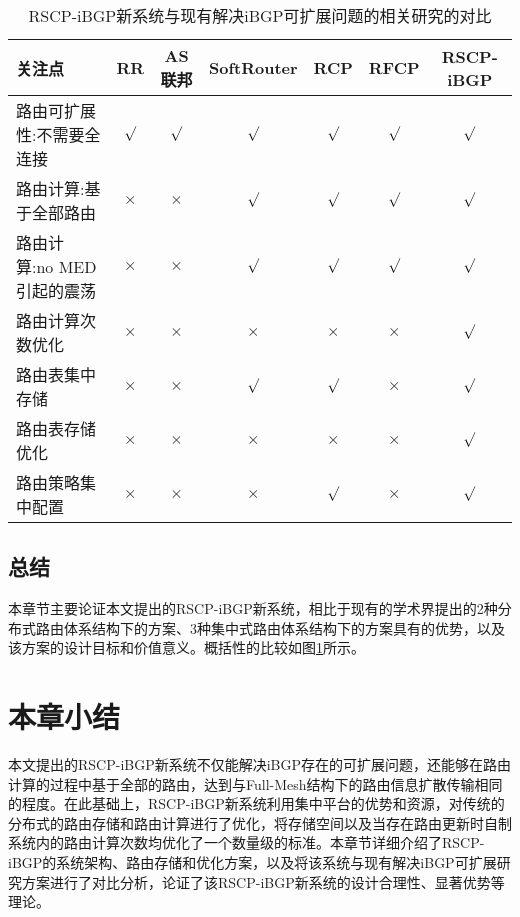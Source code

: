 \begin{table}[h]
	\centering
	\caption{RSCP-iBGP新系统与现有解决iBGP可扩展问题的相关研究的对比}
    \label{tab:compare}
	\begin{tabular}{|l|c|c|c|c|c|c|}
		\hline
		关注点 & RR & AS联邦 & SoftRouter & RCP & RFCP & RSCP-iBGP \\ \hline
		路由可扩展性:不需要全连接 &  $\surd$ &  $\surd$  & $\surd$  &$\surd$ & $\surd$  &$\surd$  \\ \hline
        路由计算:基于全部路由 & $\times$ &  $\times$  & $\surd$  &$\surd$ & $\surd$  &$\surd$  \\ \hline
        路由计算:no MED引起的震荡 &  $\times$ &  $\times$  & $\surd$  &$\surd$ & $\surd$  &$\surd$  \\ \hline
        路由计算次数优化&  $\times$ &  $\times$  & $\times$  &$\times$ & $\times$  &$\surd$  \\ \hline
        路由表集中存储&  $\times$ &  $\times$  & $\surd$  &$\surd$ & $\times$  &$\surd$  \\ \hline
        路由表存储优化&  $\times$ &  $\times$  & $\times$  &$\times$ & $\times$  &$\surd$  \\ \hline
        路由策略集中配置&  $\times$ &  $\times$  & $\times$  & $\surd$ & $\times$  &$\surd$  \\ \hline
	\end{tabular}
\end{table}

\subsection{总结}

本章节主要论证本文提出的RSCP-iBGP新系统，相比于现有的学术界提出的2种分布式路由体系结构下的方案、3种集中式路由体系结构下的方案具有的优势，以及该方案的设计目标和价值意义。概括性的比较如图\ref{tab:compare}所示。



\section{本章小结}

本文提出的RSCP-iBGP新系统不仅能解决iBGP存在的可扩展问题，还能够在路由计算的过程中基于全部的路由，达到与Full-Mesh结构下的路由信息扩散传输相同的程度。在此基础上，RSCP-iBGP新系统利用集中平台的优势和资源，对传统的分布式的路由存储和路由计算进行了优化，将存储空间以及当存在路由更新时自制系统内的路由计算次数均优化了一个数量级的标准。本章节详细介绍了RSCP-iBGP的系统架构、路由存储和优化方案，以及将该系统与现有解决iBGP可扩展研究方案进行了对比分析，论证了该RSCP-iBGP新系统的设计合理性、显著优势等理论。

